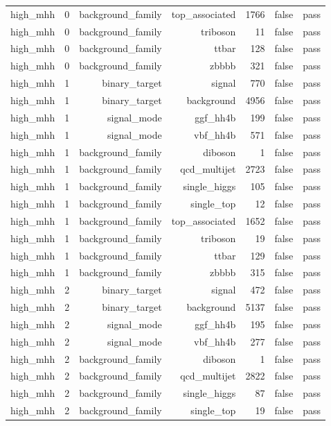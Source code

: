 \begin{table}[htbp]
{\begin{tabular}{lrrrrrr}
high\_mhh & 0 & background\_family & top\_associated & 1766 & false & pass \\
high\_mhh & 0 & background\_family & triboson & 11 & false & pass \\
high\_mhh & 0 & background\_family & ttbar & 128 & false & pass \\
high\_mhh & 0 & background\_family & zbbbb & 321 & false & pass \\
high\_mhh & 1 & binary\_target & signal & 770 & false & pass \\
high\_mhh & 1 & binary\_target & background & 4956 & false & pass \\
high\_mhh & 1 & signal\_mode & ggf\_hh4b & 199 & false & pass \\
high\_mhh & 1 & signal\_mode & vbf\_hh4b & 571 & false & pass \\
high\_mhh & 1 & background\_family & diboson & 1 & false & pass \\
high\_mhh & 1 & background\_family & qcd\_multijet & 2723 & false & pass \\
high\_mhh & 1 & background\_family & single\_higgs & 105 & false & pass \\
high\_mhh & 1 & background\_family & single\_top & 12 & false & pass \\
high\_mhh & 1 & background\_family & top\_associated & 1652 & false & pass \\
high\_mhh & 1 & background\_family & triboson & 19 & false & pass \\
high\_mhh & 1 & background\_family & ttbar & 129 & false & pass \\
high\_mhh & 1 & background\_family & zbbbb & 315 & false & pass \\
high\_mhh & 2 & binary\_target & signal & 472 & false & pass \\
high\_mhh & 2 & binary\_target & background & 5137 & false & pass \\
high\_mhh & 2 & signal\_mode & ggf\_hh4b & 195 & false & pass \\
high\_mhh & 2 & signal\_mode & vbf\_hh4b & 277 & false & pass \\
high\_mhh & 2 & background\_family & diboson & 1 & false & pass \\
high\_mhh & 2 & background\_family & qcd\_multijet & 2822 & false & pass \\
high\_mhh & 2 & background\_family & single\_higgs & 87 & false & pass \\
high\_mhh & 2 & background\_family & single\_top & 19 & false & pass \\

\end{tabular}}
\end{table}
